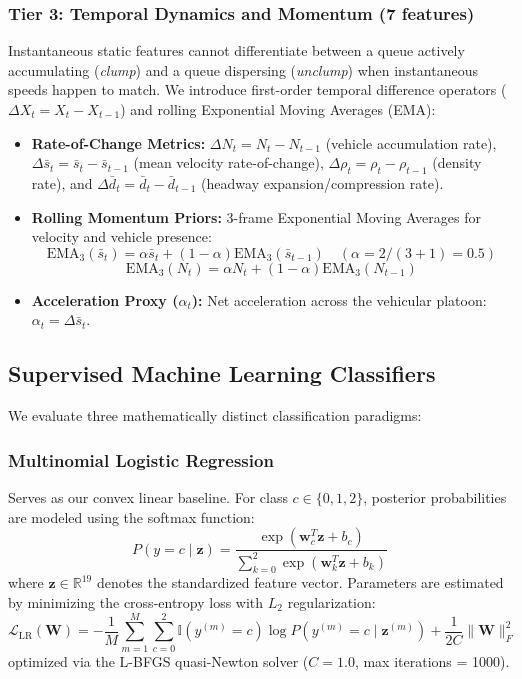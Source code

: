 \documentclass[conference]{IEEEtran}
\begin{document}
\subsubsection{Tier 3: Temporal Dynamics and Momentum (7 features)}
Instantaneous static features cannot differentiate between a queue actively accumulating (\textit{clump}) and a queue dispersing (\textit{unclump}) when instantaneous speeds happen to match. We introduce first-order temporal difference operators ($\Delta X_t = X_t - X_{t-1}$) and rolling Exponential Moving Averages (EMA):
\begin{itemize}
    \item \textbf{Rate-of-Change Metrics:} $\Delta N_t = N_t - N_{t-1}$ (vehicle accumulation rate), $\Delta \bar{s}_t = \bar{s}_t - \bar{s}_{t-1}$ (mean velocity rate-of-change), $\Delta \rho_t = \rho_t - \rho_{t-1}$ (density rate), and $\Delta \bar{d}_t = \bar{d}_t - \bar{d}_{t-1}$ (headway expansion/compression rate).
    \item \textbf{Rolling Momentum Priors:} 3-frame Exponential Moving Averages for velocity and vehicle presence:
    \begin{equation}
        \text{EMA}_3(\bar{s}_t) = \alpha \bar{s}_t + (1-\alpha) \text{EMA}_3(\bar{s}_{t-1}) \quad (\alpha = 2/(3+1) = 0.5)
    \end{equation}
    \begin{equation}
        \text{EMA}_3(N_t) = \alpha N_t + (1-\alpha) \text{EMA}_3(N_{t-1})
    \end{equation}
    \item \textbf{Acceleration Proxy ($\alpha_t$):} Net acceleration across the vehicular platoon: $\alpha_t = \Delta \bar{s}_t$.
\end{itemize}

\subsection{Supervised Machine Learning Classifiers}
We evaluate three mathematically distinct classification paradigms:

\subsubsection{Multinomial Logistic Regression}
Serves as our convex linear baseline. For class $c \in \{0, 1, 2\}$, posterior probabilities are modeled using the softmax function:
\begin{equation}
    P(y = c \mid \mathbf{z}) = \frac{\exp(\mathbf{w}_c^T \mathbf{z} + b_c)}{\sum_{k=0}^2 \exp(\mathbf{w}_k^T \mathbf{z} + b_k)}
\end{equation}
where $\mathbf{z} \in \mathbb{R}^{19}$ denotes the standardized feature vector. Parameters are estimated by minimizing the cross-entropy loss with $L_2$ regularization:
\begin{equation}
    \mathcal{L}_{\text{LR}}(\mathbf{W}) = -\frac{1}{M}\sum_{m=1}^M \sum_{c=0}^2 \mathbb{I}(y^{(m)}=c)\log P(y^{(m)}=c \mid \mathbf{z}^{(m)}) + \frac{1}{2C}\|\mathbf{W}\|_F^2
\end{equation}
optimized via the L-BFGS quasi-Newton solver ($C=1.0$, max iterations = 1000).
\end{document}
